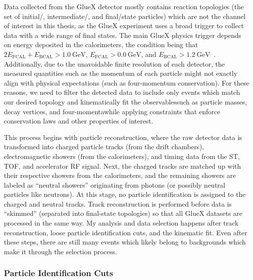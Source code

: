Data collected from the GlueX detector mostly contains reaction topologies (the set of initial\-/, intermediate\-/, and final\-/state particles) which are not the channel of interest in this thesis, as the GlueX experiment uses a broad trigger to collect data with a wide range of final states. The main GlueX physics trigger depends on energy deposited in the calorimeters, the condition being that $2E_{\text{FCAL}}+E_{\text{BCAL}} > \SI{1.0}{\giga\electronvolt}$, $E_{\text{FCAL}} > \SI{0.0}{\giga\electronvolt}$, and $E_{\text{BCAL}} > \SI{1.2}{\giga\electronvolt}$~\cite{Adhikari2021}. Additionally, due to the unavoidable finite resolution of each detector, the measured quantities such as the momentum of each particle might not exactly align with physical expectations (such as four-momentum conservation). For these reasons, we need to filter the detected data to include only events which match our desired topology and kinematically fit the observables\textemdash such as particle masses, decay vertices, and four-momenta\textemdash while applying constraints that enforce conservation laws and other properties of interest.

This process begins with particle reconstruction, where the raw detector data is transformed into charged particle tracks (from the drift chambers), electromagnetic showers (from the calorimeters), and timing data from the ST, TOF, and accelerator RF signal. Next, the charged tracks are matched up with their respective showers from the calorimeters, and the remaining showers are labeled as ``neutral showers'' originating from photons (or possibly neutral particles like neutrons). At this stage, no particle identification is assigned to the charged and neutral tracks. Track reconstruction is performed before data is ``skimmed'' (separated into final-state topologies) so that all GlueX datasets are processed in the same way. My analysis and data selection happens after track reconstruction, loose particle identification cuts, and the kinematic fit. Even after these steps, there are still many events which likely belong to backgrounds which make it through the selection process.

\subsubsection{Particle Identification Cuts}

